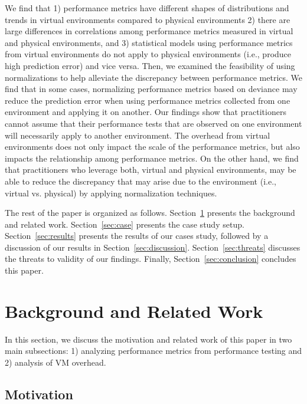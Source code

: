 \documentclass[smallextended]{svjour3}       %
\begin{document}
We find that 1) performance metrics have different shapes of distributions and trends in virtual environments compared to physical environments 2) there are large differences in correlations among performance metrics measured in virtual and physical environments, and 3) statistical models using performance metrics from virtual environments do not apply to physical environments (i.e., produce high prediction error) and vice versa. Then, we examined the feasibility of using normalizations to help alleviate the discrepancy between performance metrics. We find that in some cases, normalizing performance metrics based on deviance may reduce the prediction error when using performance metrics collected from one environment and applying it on another. Our findings show that practitioners cannot assume that their performance tests that are observed on one environment will necessarily apply to another environment. The overhead from virtual environments does not only impact the scale of the performance metrics, but also impacts the relationship among performance metrics. On the other hand, we find that practitioners who leverage both, virtual and physical environments, may be able to reduce the discrepancy that may arise due to the environment (i.e., virtual vs. physical) by applying normalization techniques.

The rest of the paper is organized as follows. Section~\ref{sec:related} presents the background and related work. Section~\ref{sec:case} presents the case study setup. Section~\ref{sec:results} presents the results of our cases study, followed by a discussion of our results in Section~\ref{sec:discussion}. Section~\ref{sec:threats} discusses the threats to validity of our findings. Finally, Section~\ref{sec:conclusion} concludes this paper.


\section{Background and Related Work}
\label{sec:related}
In this section, we discuss the motivation and related work of this paper in two main subsections: 1) analyzing performance metrics from performance testing and 2) analysis of VM overhead. 

\subsection{Motivation}
\end{document}
